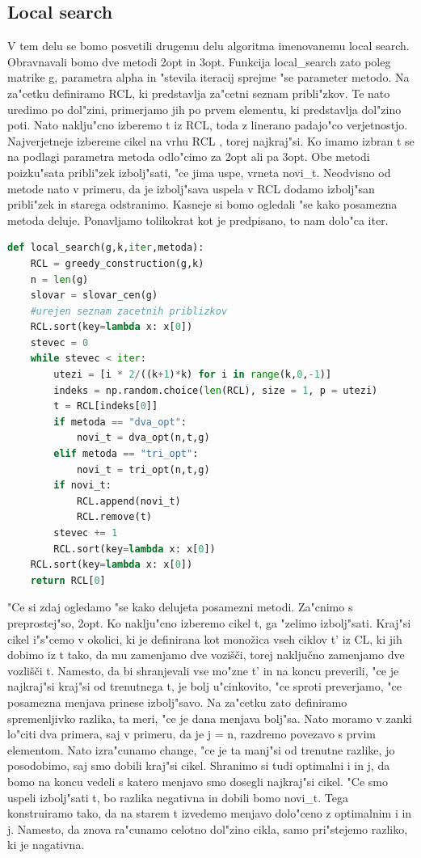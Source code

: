 \documentclass[12pt,a4paper]{amsart}
\theoremstyle{definition} %
\theoremstyle{plain} %
\begin{document}
\subsection{Local search} 

V tem delu se bomo posvetili drugemu delu algoritma imenovanemu local search. Obravnavali bomo dve metodi 2opt in 3opt. Funkcija local\_search zato poleg matrike g, parametra alpha in "stevila iteracij sprejme "se parameter metodo. 
Na za"cetku definiramo RCL, ki predstavlja za"cetni seznam pribli"zkov. Te nato uredimo po dol"zini, primerjamo jih po prvem elementu, ki predstavlja dol"zino poti. Nato naklju"cno izberemo t iz RCL, toda z linerano padajo"co verjetnostjo. Najverjetneje izbereme cikel na vrhu RCL , torej najkraj"si. Ko imamo izbran t se na podlagi parametra metoda odlo"cimo za 2opt ali pa 3opt. Obe metodi poizku"sata pribli"zek izbolj"sati, "ce jima uspe, vrneta novi\_t. Neodvisno od metode nato v primeru, da je izbolj"sava uspela v RCL dodamo izbolj"san pribli"zek in starega odstranimo. Kasneje si bomo ogledali "se kako posamezna metoda deluje. Ponavljamo tolikokrat kot je predpisano, to nam dolo"ca iter. 


\begin{lstlisting}[language=Python]
def local_search(g,k,iter,metoda):
    RCL = greedy_construction(g,k)
    n = len(g)
    slovar = slovar_cen(g)
    #urejen seznam zacetnih priblizkov
    RCL.sort(key=lambda x: x[0])
    stevec = 0
    while stevec < iter:
        utezi = [i * 2/((k+1)*k) for i in range(k,0,-1)]
        indeks = np.random.choice(len(RCL), size = 1, p = utezi)
        t = RCL[indeks[0]]
        if metoda == "dva_opt":
            novi_t = dva_opt(n,t,g)
        elif metoda == "tri_opt":
            novi_t = tri_opt(n,t,g)      
        if novi_t:
            RCL.append(novi_t)
            RCL.remove(t)   
        stevec += 1
        RCL.sort(key=lambda x: x[0])
    RCL.sort(key=lambda x: x[0])
    return RCL[0]
\end{lstlisting}

"Ce si zdaj ogledamo "se kako delujeta posamezni metodi. Za"cnimo s preprostej"so, 2opt. 
Ko naklju"cno izberemo cikel t, ga "zelimo izbolj"sati. Kraj"si cikel i"s"cemo v okolici, ki je definirana kot monožica vseh ciklov t' iz CL, 
ki jih dobimo iz t tako, da mu zamenjamo dve vozišči, torej naključno zamenjamo dve vozlišči t. Namesto, da bi shranjevali vse mo"zne  t' in na koncu preverili, "ce je najkraj"si kraj"si od trenutnega t, je bolj u"cinkovito, "ce sproti preverjamo, "ce posamezna menjava prinese izbolj"savo. Na za"cetku zato definiramo spremenljivko razlika, ta meri, "ce je dana menjava bolj"sa. Nato moramo v zanki lo"citi dva primera, saj v primeru, da je j = n, razdremo povezavo s prvim elementom. Nato izra"cunamo change, "ce je ta manj"si od trenutne razlike, jo posodobimo, saj smo dobili kraj"si cikel. Shranimo si tudi optimalni i in j, da bomo na koncu vedeli s katero menjavo smo dosegli najkraj"si cikel. "Ce smo uspeli izbolj"sati t, bo razlika negativna in dobili bomo novi\_t. Tega konstruiramo tako, da na starem t izvedemo menjavo dolo"ceno z optimalnim i in j. Namesto, da znova ra"cunamo celotno dol"zino cikla, samo pri"stejemo razliko, ki je nagativna. 
\end{document}
